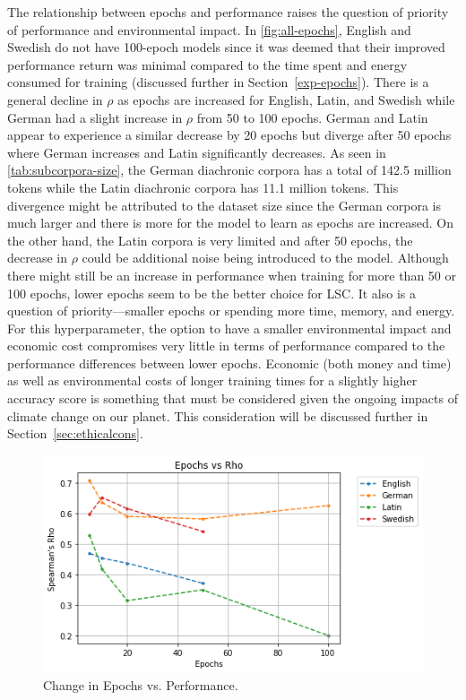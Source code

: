 The relationship between epochs and performance raises the question of priority of performance and environmental impact. In \autoref{fig:all-epochs}, English and Swedish do not have 100-epoch models since it was deemed that their improved performance return was minimal compared to the time spent and energy consumed for training (discussed further in Section~\ref{exp-epochs}). There is a general decline in $\rho$ as epochs are increased for English, Latin, and Swedish while German had a slight increase in $\rho$ from 50 to 100 epochs. German and Latin appear to experience a similar decrease by 20 epochs but diverge after 50 epochs where German increases and Latin significantly decreases. As seen in \autoref{tab:subcorpora-size}, the German diachronic corpora has a total of 142.5 million tokens while the Latin diachronic corpora has 11.1 million tokens. This divergence might be attributed to the dataset size since the German corpora is much larger and there is more for the model to learn as epochs are increased.  On the other hand, the Latin corpora is very limited and after 50 epochs, the decrease in $\rho$ could be additional noise being introduced to the model. Although there might still be an increase in performance when training for more than 50 or 100 epochs, lower epochs seem to be the better choice for LSC. It also is a question of priority—smaller epochs or spending more time, memory, and energy. For this hyperparameter, the option to have a smaller environmental impact and economic cost compromises very little in terms of performance compared to the performance differences between lower epochs. Economic (both money and time) as well as environmental costs of longer training times for a slightly higher accuracy score is something that must be considered given the ongoing impacts of climate change on our planet. This consideration will be discussed further in Section~\ref{sec:ethicalcons}.



\begin{figure}[h]
  \centering
  \includegraphics[width=.8\linewidth]{sections/figures/epochs_all.png}
  \caption{Change in Epochs vs. Performance.}
  \label{fig:all-epochs}
\end{figure}


